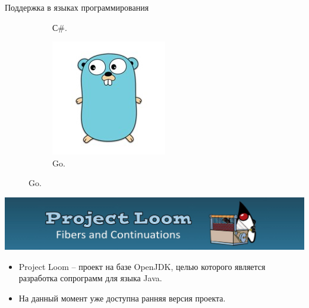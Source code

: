 \begin{frame}{Поддержка в языках программирования}
\begin{figure}
\begin{subfigure}[b]{0.24\linewidth}
		\caption{С\#.}
	\end{subfigure}
	\hfill
	\begin{subfigure}[b]{0.35\linewidth}
		\includegraphics[width=\linewidth, scale=0.35]{images/go.jpg}
		\caption{Go.}
	\end{subfigure}

	\end{figure}
\end{frame}

\begin{frame}
	\includegraphics[scale=0.5]{images/loom.jpg}
	
	\begin{itemize}
	\item	Project Loom – проект на базе OpenJDK, целью которого является разработка сопрограмм для языка Java. 
	\item	На данный момент уже доступна ранняя версия проекта.
	\end{itemize}
\end{frame}

